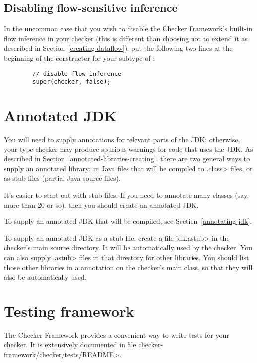 \subsection{Disabling flow-sensitive inference\label{creating-dataflow-disable}}

In the uncommon case that you wish to disable the Checker Framework's
built-in flow inference in your checker (this is different than choosing
not to extend it as described in Section~\ref{creating-dataflow}), put the
following two lines at the beginning of the constructor for your subtype of
:

\begin{Verbatim}
        // disable flow inference
        super(checker, false);
\end{Verbatim}


\section{Annotated JDK\label{creating-a-checker-annotated-jdk}}

You will need to supply annotations for relevant parts of the JDK;
otherwise, your type-checker may produce spurious warnings for code that
uses the JDK.  As described in Section~\ref{annotated-libraries-creating},
there are two general ways to supply an annotated library:  in Java files
that will be compiled to \<.class> files, or as stub files (partial Java source files).

It's easier to start out with stub files.  If you need to annotate many
classes (say, more than 20 or so), then you should create an annotated JDK.

To supply an annotated JDK that will be compiled, see Section~\ref{annotating-jdk}.

To supply an annotated JDK as a stub file, create a file \<jdk.astub> in
the checker's main source directory.  It will be automatically used by the
checker.
You can also supply \<.astub> files in that directory for other libraries.
You should list those other libraries in a
 annotation on the checker's main
class, so that they will also be automatically used.


\section{Testing framework\label{creating-testing-framework}}

\begin{sloppypar}
The Checker Framework provides a convenient way to write tests for your
checker.
It is extensively documented in file \<checker-framework/checker/tests/README>.
\end{sloppypar}

